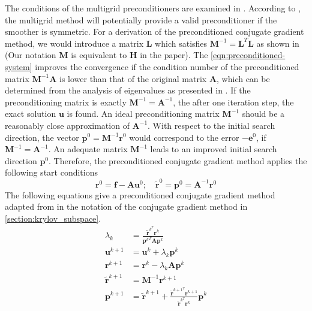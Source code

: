  The conditions of the multigrid preconditioners are examined in \citep{tatebe1993multigrid}. According to \citep{wesseling2004introduction}, the multigrid method will potentially provide a valid preconditioner if the smoother is symmetric. For a derivation of the preconditioned conjugate gradient method, we would introduce a matrix $\boldsymbol{L}$ which satisfies $\boldsymbol{M}^{-1} = \boldsymbol{L}^T\boldsymbol{L}$ as shown in \citep{wesseling2004introduction} (Our notation $\boldsymbol{M}$ is equivalent to $\boldsymbol{H}$ in the paper). The \autoref{eqn:preconditioned-system}  improves the convergence if the condition number of the preconditioned matrix $\boldsymbol{M}^{-1}\boldsymbol{A}$ is lower than that of the original matrix $\boldsymbol{A}$, which can be determined from the analysis of eigenvalues as presented in \citep{hackbusch2013iterative}. If the preconditioning matrix is exactly $\boldsymbol{M}^{-1} = \boldsymbol{A}^{-1}$, the after one iteration step, the exact solution $\boldsymbol{u}$ is found. An ideal preconditioning matrix $\boldsymbol{M}^{-1}$ should be a reasonably close approximation of $\boldsymbol{A}^{-1}$. With respect to the initial search direction, the vector $\boldsymbol{p}^0 = \boldsymbol{M}^{-1}\boldsymbol{r}^0$ would correspond to the error $-\boldsymbol{e}^0$, if $\boldsymbol{M}^{-1} = \boldsymbol{A}^{-1}$. An adequate matrix $\boldsymbol{M}^{-1}$ leads to an improved initial search direction $\boldsymbol{p}^0$. Therefore, the preconditioned conjugate gradient method applies the following start conditions
\begin{equation}
    \boldsymbol{r}^0 = \boldsymbol{f} - \boldsymbol{A}\boldsymbol{u}^0; \quad \tilde{\boldsymbol{r}}^0 = \boldsymbol{p}^0 = \boldsymbol{A}^{-1}\boldsymbol{r}^0
\end{equation}
The following equations give a preconditioned conjugate gradient method adapted from \citep{tatebe1993multigrid} in the notation of the conjugate gradient method in \autoref{section:krylov_subspace}.
\begin{align}
    \lambda_k &= \frac{\tilde{\boldsymbol{r}}^{k^T}\boldsymbol{r}^k}{{\boldsymbol{p}^k}^T\boldsymbol{A}\boldsymbol{p}^k} \\
    \boldsymbol{u}^{k+1} &= \boldsymbol{u}^k + \lambda_k\boldsymbol{p}^k \\
    \boldsymbol{r}^{k+1} &= \boldsymbol{r}^k - \lambda_k\boldsymbol{A}\boldsymbol{p}^k \\
    \tilde{\boldsymbol{r}}^{k+1} &= \boldsymbol{M}^{-1} \boldsymbol{r}^{k+1} \label{step:pcg}\\
    \boldsymbol{p}^{k+1} &= \tilde{\boldsymbol{r}}^{k+1} + \frac{\tilde{\boldsymbol{r}}^{{k+1}^T}\boldsymbol{r}^{k+1}}{\tilde{\boldsymbol{r}}^{k^T}\boldsymbol{r}^k} \boldsymbol{p}^k %
\end{align}

